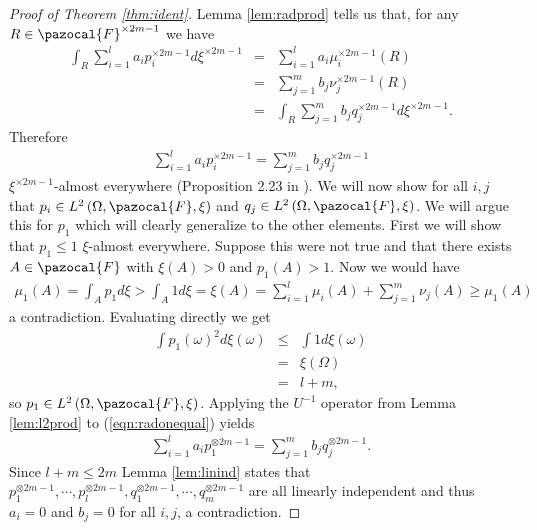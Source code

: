 \documentclass{article} %
\def\sF{\pazocal{F}}
\theoremstyle{definition}
\begin{document}
\begin{proof}[Proof of Theorem \ref{thm:ident}]
Lemma \ref{lem:radprod} tells us that, for any $R \in \sF^{\times 2m-1}$  we have
\begin{eqnarray*}
	\int_R \sum_{i=1}^{l} a_i p_i^{\times 2m-1} d\xi^{\times 2m-1} 
	&=&  \sum_{i=1}^{l} a_i \mu_i^{\times 2m-1}\left( R \right)\\
	&=&  \sum_{j=1}^{m} b_j \nu_j^{\times 2m-1}\left( R \right)\\
	&=& \int_R \sum_{j=1}^{m} b_j q_j^{\times 2m-1}d\xi^{\times 2m-1}.
\end{eqnarray*}
Therefore
\begin{eqnarray} \label{eqn:radonequal}
	\sum_{i=1}^{l} a_i p_i^{\times 2m-1} = \sum_{j=1}^{m} b_j q_j^{\times 2m-1}
\end{eqnarray}
$\xi^{\times 2m-1}$-almost everywhere (Proposition 2.23 in \cite{folland99}).
We will now show for all $i,j$ that $p_i \in L^2 \left( \Omega, \sF, \xi \right)$ and $q_j \in L^2\left( \Omega, \sF, \xi \right)$. We will argue this for $p_1$ which will clearly generalize to the other elements. First we will show that $p_1 \le 1$ $\xi$-almost everywhere. Suppose this were not true and that there exists $A \in \sF$ with $\xi\left( A \right)>0$ and $p_1\left( A \right)>1$. Now we would have 
\begin{eqnarray*}
	\mu_1\left( A \right)
	=\int_A p_1 d\xi
	> \int_A 1 d\xi
	= \xi\left( A \right)
	=\sum_{i=1}^l\mu_i\left( A \right) + \sum_{j=1}^m \nu_j\left( A \right)
	\ge \mu_1\left( A \right)
\end{eqnarray*}
a contradiction. Evaluating directly we get
\begin{eqnarray*}
	\int p_1(\omega)^2 d \xi\left( \omega \right)
	&\le& \int 1 d \xi\left( \omega \right)\\
	&=& \xi\left( \Omega \right)\\
	&=& l+m,
\end{eqnarray*}
so $p_1 \in L^2\left( \Omega, \sF, \xi \right)$.
Applying the $U^{-1}$ operator from Lemma \ref{lem:l2prod} to (\ref{eqn:radonequal}) yields
\begin{eqnarray*}
		\sum_{i=1}^{l} a_i p_1^{\otimes 2m-1} = \sum_{j=1}^{m} b_j q_j^{\otimes 2m-1}.
\end{eqnarray*}
Since $l+m \le2m$ Lemma \ref{lem:linind} states that $p_1^{\otimes 2m-1},\cdots,p_{l}^{\otimes 2m-1},q_1^{\otimes 2m-1},\cdots,q_{m}^{\otimes 2m-1}$ are all linearly independent and thus $a_i = 0$ and $b_j = 0$ for all $i,j$, a contradiction.
\end{proof}
\end{document}
